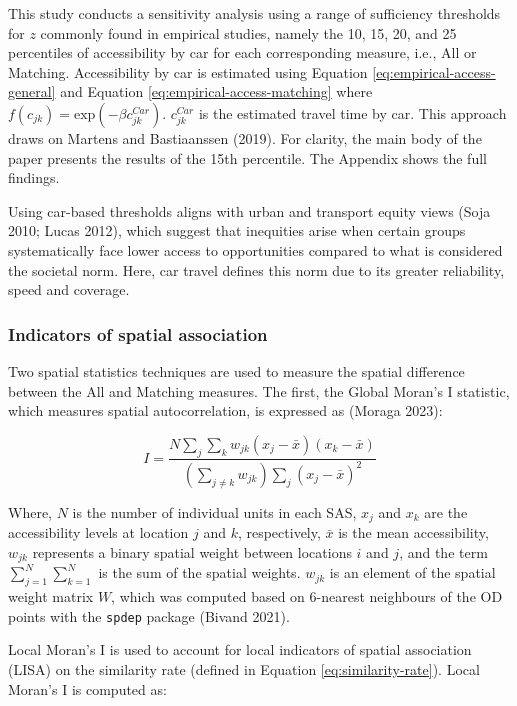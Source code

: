 \documentclass{article}
\begin{document}
This study conducts a sensitivity analysis using a range of sufficiency
thresholds for \(z\) commonly found in empirical studies, namely the 10,
15, 20, and 25 percentiles of accessibility by car for each
corresponding measure, i.e., All or Matching. Accessibility by car is
estimated using Equation \ref{eq:empirical-access-general} and Equation
\ref{eq:empirical-access-matching} where
\(f(c_{jk}) = \text{exp}(-\beta c^{Car}_{jk})\). \(c^{Car}_{jk}\) is the
estimated travel time by car. This approach draws on Martens and
Bastiaanssen (2019). For clarity, the main body of the paper presents
the results of the 15th percentile. The Appendix shows the full
findings.

Using car-based thresholds aligns with urban and transport equity views
(Soja 2010; Lucas 2012), which suggest that inequities arise when
certain groups systematically face lower access to opportunities
compared to what is considered the societal norm. Here, car travel
defines this norm due to its greater reliability, speed and coverage.

\subsubsection{Indicators of spatial
association}\label{indicators-of-spatial-association}

Two spatial statistics techniques are used to measure the spatial
difference between the All and Matching measures. The first, the Global
Moran's I statistic, which measures spatial autocorrelation, is
expressed as (Moraga 2023):

\begin{equation}
  I = \frac{N \sum_{j} \sum_{k} w_{jk} (x_j - \bar{x}) (x_k - \bar{x})}{\left( \sum_{j \neq k} w_{jk} \right) \sum_{j} (x_j - \bar{x})^2}
\label{eq:moran-i-statistic}
\end{equation}

Where, \(N\) is the number of individual units in each SAS, \(x_j\) and
\(x_k\) are the accessibility levels at location \(j\) and \(k\),
respectively, \(\bar{x}\) is the mean accessibility, \(w_{jk}\)
represents a binary spatial weight between locations \(i\) and \(j\),
and the term \(\sum^N_{j=1} \sum^N_{k=1}\) is the sum of the spatial
weights. \(w_{jk}\) is an element of the spatial weight matrix \(W\),
which was computed based on 6-nearest neighbours of the OD points with
the \texttt{spdep} package (Bivand 2021).

Local Moran's I is used to account for local indicators of spatial
association (LISA) on the similarity rate (defined in Equation
\ref{eq:similarity-rate}). Local Moran's I is computed as:
\end{document}
